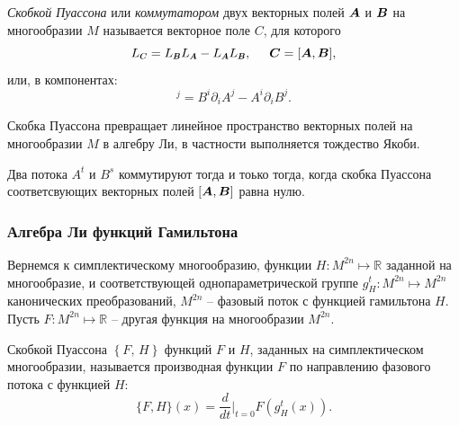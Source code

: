 \begin{to_def}
    \textit{Скобкой Пуассона} или \textit{коммутатором} двух векторных полей $\mbox{\boldmath $A$}$ и $\mbox{\boldmath $B$}$ на многообразии $M$ называется векторное поле $C$, для которого
    \begin{equation*}
        \li{C} = \li{B} \li{A} - \li{A} \li{B}, \hspace{5 mm} \vc{C} = [\vc{A}, \vc{B}],
    \end{equation*}
    или, в компонентах:
    \begin{equation*}
        [\vc{A}, \vc{B}]^j = 
        B^i \partial_i A^j - A^i \partial_i B^j.
    \end{equation*}
\end{to_def} 

\begin{to_thr}[]
    Скобка Пуассона превращает линейное пространство векторных полей на многообразии $M$ в алгебру Ли, в частности  выполняется тождество Якоби. 
\end{to_thr}

\begin{to_thr}[]
    Два потока $A^t$ и $B^s$ коммутируют тогда и тоько тогда, когда скобка Пуассона соответсвующих векторных полей $[\mbox{\boldmath $A$}, \mbox{\boldmath $B$}]$ равна нулю. 
\end{to_thr}





\subsubsection*{Алгебра Ли функций Гамильтона}


Вернемся к симплектическому многообразию, функции $H \colon  M^{2n} \mapsto \mathbb{R}$ заданной на многообразие, и соответствующей однопараметрической группе $g_H^t \colon  M^{2n} \mapsto M^{2n}$ канонических преобразований, $M^{2n}$ -- фазовый поток с функцией гамильтона $H$. Пусть $F \colon  M^{2n} \mapsto \mathbb{R}$ -- другая функция на многообразии $M^{2n}$.

\begin{to_def}
    Скобкой Пуассона $\left\{F,\, H\right\}$ функций $F$ и $H$, заданных на симплектическом многообразии, называется производная функции $F$ по направлению фазового потока с функцией $H$:
    \begin{equation*}
        \{F, H\} (x) = \frac{d }{d t} \bigg|_{t=0} F(g^t_H (x)).
    \end{equation*}
\end{to_def}

